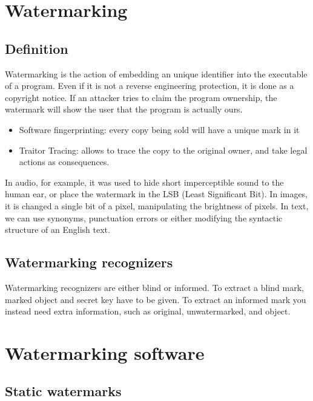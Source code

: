 \section{Watermarking}

\subsection{Definition}

Watermarking is the action of embedding an unique identifier into the executable of a program. Even if it is not a reverse engineering protection, it is done as a copyright notice. 
If an attacker tries to claim the program ownership, the watermark will show the user that the program is actually ours. 

\begin{itemize}
    \item Software fingerprinting: every copy being sold will have a unique mark in it
    \item Traitor Tracing: allows to trace the copy to the original owner, and take legal actions as consequences. 
\end{itemize}

In audio, for example, it was used to hide short imperceptible sound to the human ear, or place the watermark in the LSB (Least Significant Bit). \newline
In images, it is changed a single bit of a pixel, manipulating the brightness of pixels. 
In text, we can use synonyms, punctuation errors or either modifying the syntactic structure of an English text. 

\subsection{Watermarking recognizers}

Watermarking recognizers are either blind or informed. 
To extract a blind mark, marked object and secret key have to be given. 
To extract an informed mark you instead need extra information, such as original, unwatermarked, and object. 

\section{Watermarking software}

\subsection{Static watermarks}

